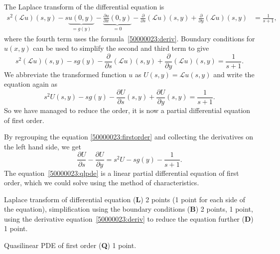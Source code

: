 \begin{loesung}
\begin{teilaufgaben}
\item
The Laplace transform of the differential equation is
\begin{align*}
s^2(\mathscr{L}u)(s,y)
-
s
\underbrace{u(0,y)}_{\textstyle=g(y)}
-
\underbrace{\frac{\partial u}{\partial x}(0,y)}_{\textstyle=0}
-
\frac{\partial }{\partial s}(\mathscr{L}u)(s,y)
+
\frac{\partial }{\partial y}(\mathscr{L}u)(s,y)
&=
\frac1{s+1},
\end{align*}
where the fourth term uses the formula~\eqref{50000023:deriv}.
Boundary conditions for $u(x,y)$ can be used to simplify the
second and third term to give
\[
s^2(\mathscr{L}u)(s,y)-sg(y) - \frac{\partial}{\partial s}(\mathscr{L}u)(s,y)
+
\frac{\partial}{\partial y}(\mathscr{L}u)(s,y)
=
\frac1{s+1}.
\]
We abbreviate the transformed function $u$ as $U(s,y) = \mathscr{L}u(s,y)$
and write the equation again as
\begin{equation}
s^2 U(s,y) - sg(y) -\frac{\partial U}{\partial s}(s,y)
+ \frac{\partial U}{\partial y}(s,y)
=
\frac1{s+1}.
\label{50000023:firstorder}
\end{equation}
So we have managed to reduce the order, it is now a partial differential
equation of first order.
\item
By regrouping the equation \eqref{50000023:firstorder}  and collecting
the derivatives on the left hand side, we get
\begin{equation}
\frac{\partial U}{\partial s} - \frac{\partial U}{\partial y}
=
s^2 U - sg(y) - \frac{1}{s+1}.
\label{50000023:qlpde}
\end{equation}
The equation~\eqref{50000023:qlpde} is a linear partial differential
equation of first order, which we could solve using the method of
characteristics.
\qedhere
\end{teilaufgaben}
\end{loesung}


\begin{bewertung}
\begin{teilaufgaben}
\item
Laplace transform of differential equation ({\bf L}) 2 points (1 point
for each side of the equation),
simplification using the boundary conditions ({\bf B}) 2 points,
1 point,
using the derivative equation~\eqref{50000023:deriv} to reduce the
equation further ({\bf D}) 1 point.
\item
Quasilinear PDE of first order ({\bf Q}) 1 point.
\end{teilaufgaben}
\end{bewertung}

